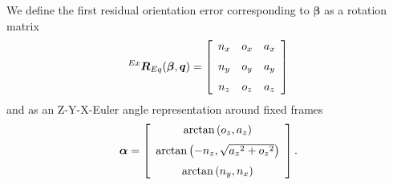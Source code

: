\documentclass[twocolumn,10pt]{IFTOMM}
\newcommand{\bm}[1]{\boldsymbol{#1}}
\newcommand{\rotmat}[2]{{{ }^{#1}\boldsymbol{R}}_{#2}}
\begin{document}
We define the first residual orientation error corresponding to $\bm{\beta}$ as a rotation matrix
%
\begin{align}
\rotmat{Ex}{Eq}(\bm{\beta},\bm{q})
=\left[ \begin {array}{ccc} {n_x}&{o_x}&{a_x} \\ \noalign{\medskip}{n_y}&{o_y}&{a_y}\\ \noalign{\medskip}{ n_z}&{o_z}&{a_z}\end {array} \right] 
\end{align}
%
and as an Z-Y-X-Euler angle representation around fixed frames
%
\begin{align}
\bm{\alpha} =
\left[ \begin {array}{c} \arctan \left( {o_z},{a_z} \right)  \\ \noalign{\medskip}\arctan \left( -{n_z},\sqrt {{{a_z}}^{2}+{{ o_z}}^{2}} \right) \\ \noalign{\medskip}\arctan \left( {n_y},{ n_x} \right) \end {array} \right].
\label{equ:alpha_xyz}
\end{align}
\end{document}
